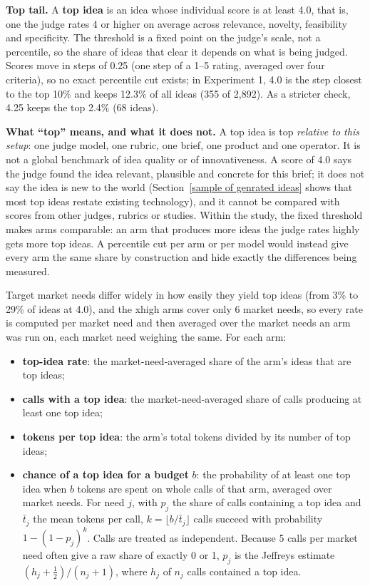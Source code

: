 \textbf{Top tail.} A \textbf{top idea} is an idea whose individual score is at least 4.0, that is, one the judge rates 4 or higher on average across relevance, novelty, feasibility and specificity. The threshold is a fixed point on the judge's scale, not a percentile, so the share of ideas that clear it depends on what is being judged. Scores move in steps of 0.25 (one step of a 1--5 rating, averaged over four criteria), so no exact percentile cut exists; in Experiment 1, 4.0 is the step closest to the top 10\% and keeps 12.3\% of all ideas (355 of 2,892). As a stricter check, 4.25 keeps the top 2.4\% (68 ideas).

\textbf{What ``top'' means, and what it does not.} A top idea is top \emph{relative to this setup}: one judge model, one rubric, one brief, one product and one operator. It is not a global benchmark of idea quality or of innovativeness. A score of 4.0 says the judge found the idea relevant, plausible and concrete for this brief; it does not say the idea is new to the world (Section~\ref{sample of genrated ideas} shows that most top ideas restate existing technology), and it cannot be compared with scores from other judges, rubrics or studies. Within the study, the fixed threshold makes arms comparable: an arm that produces more ideas the judge rates highly gets more top ideas. A percentile cut per arm or per model would instead give every arm the same share by construction and hide exactly the differences being measured.

Target market needs differ widely in how easily they yield top ideas (from 3\% to 29\% of ideas at 4.0), and the xhigh arms cover only 6 market needs, so every rate is computed per market need and then averaged over the market needs an arm was run on, each market need weighing the same. For each arm:

\begin{itemize}
\tightlist
\item
  \textbf{top-idea rate}: the market-need-averaged share of the arm's ideas that are top ideas;
\item
  \textbf{calls with a top idea}: the market-need-averaged share of calls producing at least one top idea;
\item
  \textbf{tokens per top idea}: the arm's total tokens divided by its number of top ideas;
\item
  \textbf{chance of a top idea for a budget} \(b\): the probability of at least one top idea when \(b\) tokens are spent on whole calls of that arm, averaged over market needs. For need \(j\), with \(p_j\) the share of calls containing a top idea and \(\bar t_j\) the mean tokens per call, \(k = \lfloor b / \bar t_j \rfloor\) calls succeed with probability \(1 - (1 - p_j)^k\). Calls are treated as independent. Because 5 calls per market need often give a raw share of exactly 0 or 1, \(p_j\) is the Jeffreys estimate \((h_j + \tfrac12)/(n_j + 1)\), where \(h_j\) of \(n_j\) calls contained a top idea.
\end{itemize}

